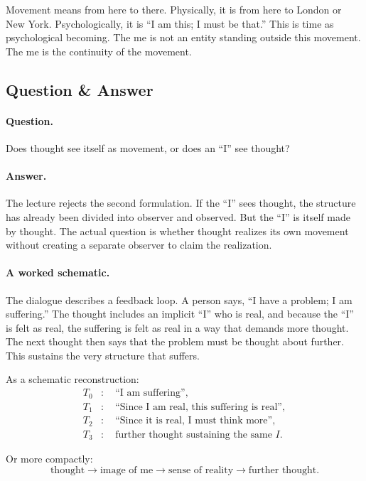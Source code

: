 Movement means from here to there. Physically, it is from here to London or New York. Psychologically, it is ``I am this; I must be that.'' This is time as psychological becoming. The me is not an entity standing outside this movement. The me is the continuity of the movement.

\subsection{Question \& Answer}

\paragraph{Question.}
Does thought see itself as movement, or does an ``I'' see thought?

\paragraph{Answer.}
The lecture rejects the second formulation. If the ``I'' sees thought, the structure has already been divided into observer and observed. But the ``I'' is itself made by thought. The actual question is whether thought realizes its own movement without creating a separate observer to claim the realization.

\paragraph{A worked schematic.}
The dialogue describes a feedback loop. A person says, ``I have a problem; I am suffering.'' The thought includes an implicit ``I'' who is real, and because the ``I'' is felt as real, the suffering is felt as real in a way that demands more thought. The next thought then says that the problem must be thought about further. This sustains the very structure that suffers.

As a schematic reconstruction:
\begin{align}
T_0 &: \quad \text{``I am suffering''}, \\
T_1 &: \quad \text{``Since I am real, this suffering is real''}, \\
T_2 &: \quad \text{``Since it is real, I must think more''}, \\
T_3 &: \quad \text{further thought sustaining the same } I.
\end{align}

Or more compactly:
\begin{equation}
\text{thought}
\longrightarrow
\text{image of me}
\longrightarrow
\text{sense of reality}
\longrightarrow
\text{further thought}.
\end{equation}

